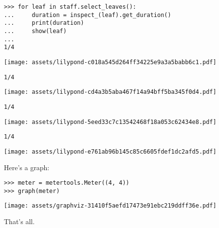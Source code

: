 \documentclass{article}
\begin{document}
\begin{lstlisting}
>>> for leaf in staff.select_leaves():
...     duration = inspect_(leaf).get_duration()
...     print(duration)
...     show(leaf)
...
1/4
\end{lstlisting}
\noindent\texttt{[image: assets/lilypond-c018a545d264ff34225e9a3a5babb6c1.pdf]}
\begin{lstlisting}
1/4
\end{lstlisting}
\noindent\texttt{[image: assets/lilypond-cd4a3b5aba467f14a94bff5ba345f0d4.pdf]}
\begin{lstlisting}
1/4
\end{lstlisting}
\noindent\texttt{[image: assets/lilypond-5eed33c7c13542468f18a053c62434e8.pdf]}
\begin{lstlisting}
1/4
\end{lstlisting}
\noindent\texttt{[image: assets/lilypond-e761ab96b145c85c6605fdef1dc2afd5.pdf]}

Here's a graph:

\begin{comment}
<abjad>
meter = metertools.Meter((4, 4))
graph(meter)
</abjad>
\end{comment}

\begin{lstlisting}
>>> meter = metertools.Meter((4, 4))
>>> graph(meter)
\end{lstlisting}
\noindent\texttt{[image: assets/graphviz-31410f5aefd17473e91ebc219ddff36e.pdf]}

That's all.
\end{document}
